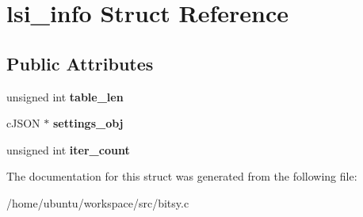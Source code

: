 \hypertarget{structlsi__info}{\section{lsi\-\_\-info Struct Reference}
\label{structlsi__info}
}
\subsection*{Public Attributes}
\begin{DoxyCompactItemize}
\item 
\hypertarget{structlsi__info_a5c66ebbfb1526c92c68fb5ac403acf0b}{unsigned int {\bfseries table\-\_\-len}}\label{structlsi__info_a5c66ebbfb1526c92c68fb5ac403acf0b}

\item 
\hypertarget{structlsi__info_ab05615e0a85951424efe5c7590898a34}{c\-J\-S\-O\-N $\ast$ {\bfseries settings\-\_\-obj}}\label{structlsi__info_ab05615e0a85951424efe5c7590898a34}

\item 
\hypertarget{structlsi__info_a154a97e557122436a68d31bd447810fa}{unsigned int {\bfseries iter\-\_\-count}}\label{structlsi__info_a154a97e557122436a68d31bd447810fa}

\end{DoxyCompactItemize}


The documentation for this struct was generated from the following file\-:\begin{DoxyCompactItemize}
\item 
/home/ubuntu/workspace/src/bitsy.\-c\end{DoxyCompactItemize}
